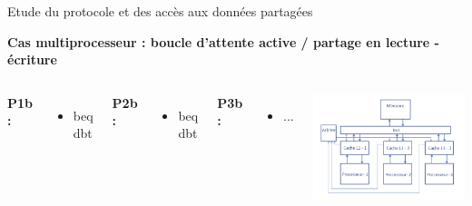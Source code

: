 \documentclass{beamer}
\begin{document}
\begin{frame}{Etude du protocole et des accès aux données partagées}
    \addtocounter{framenumber}{-1}
    \textbf{Cas multiprocesseur : boucle d’attente active / partage en lecture - \hspace*{3.8cm} écriture}
    \begin{columns}[c] %

        \textbf{P1b : }
        \begin{itemize}
            \item beq dbt
        \end{itemize}

        \textbf{P2b : }
        \begin{itemize}
            \item beq dbt
        \end{itemize}

        \textbf{P3b : }
        \begin{itemize}
            \item ...
        \end{itemize}

        \vspace{1cm}
        \includegraphics[scale=0.3]{archi.png}
        
    \end{columns}
\end{frame}
\end{document}
